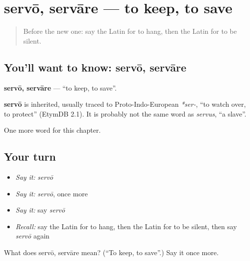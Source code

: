 \section[servō, servāre]{servō, servāre — to keep, to save}

\label{lesson:LA-C159-servo}



\begin{quote}
Before the new one: say the Latin for to hang, then the Latin for to be silent.
\end{quote}

\subsection*{You'll want to know: servō, servāre}
\textbf{servō, servāre} — \textquotedblleft{}to keep, to save\textquotedblright{}.

\begin{cousinweb}
\textbf{servō} is inherited, usually traced to Proto-Indo-European \emph{*ser-}, \textquotedblleft{}to watch over, to protect\textquotedblright{} (EtymDB 2.1). It is probably not the same word as \emph{servus}, \textquotedblleft{}a slave\textquotedblright{}.
\end{cousinweb}

\begin{grammarlens}[title={What you've built}]
One more word for this chapter.
\end{grammarlens}

\subsection*{Your turn}
\begin{itemize}
\raggedright
  \item \emph{Say it:} \emph{servō}
  \item \emph{Say it:} \emph{servō}, once more
  \item \emph{Say it:} say \emph{servō}
  \item \emph{Recall:} say the Latin for to hang, then the Latin for to be silent, then say \emph{servō} again
\end{itemize}

\begin{tcolorbox}[breakable,colback=teal!4,colframe=teal!35!black,title={Before you move on}]
What does servō, servāre mean? (\textquotedblleft{}To keep, to save\textquotedblright{}.) Say it once more.
\end{tcolorbox}
